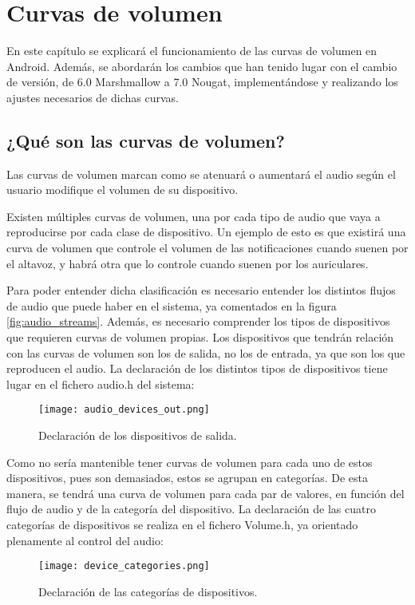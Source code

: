 \chapter{Curvas de volumen} \label{chap:curvas_volumen}
En este capítulo se explicará el funcionamiento de las curvas de volumen en Android. Además, se abordarán los cambios que han tenido lugar con el cambio de versión, de 6.0 Marshmallow a 7.0 Nougat, implementándose y realizando los ajustes necesarios de dichas curvas.

\section{¿Qué son las curvas de volumen?}
Las curvas de volumen marcan como se atenuará o aumentará el audio según el usuario modifique el volumen de su dispositivo.

Existen múltiples curvas de volumen, una por cada tipo de audio que vaya a reproducirse por cada clase de dispositivo. Un ejemplo de esto es que existirá una curva de volumen que controle el volumen de las notificaciones cuando suenen por el altavoz, y habrá otra que lo controle cuando suenen por los auriculares.

Para poder entender dicha clasificación es necesario entender los distintos flujos de audio que puede haber en el sistema, ya comentados en la figura \ref{fig:audio_streams}.
Además, es necesario comprender los tipos de dispositivos que requieren curvas de volumen propias. Los dispositivos que tendrán relación con las curvas de volumen son los de salida, no los de entrada, ya que son los que reproducen el audio. La declaración de los distintos tipos de dispositivos tiene lugar en el fichero audio.h del sistema:

\begin{figure}[H]
	\centering
	\texttt{[image: audio\_devices\_out.png]}
	\caption{Declaración de los dispositivos de salida.}
	\label{fig:audio_devices_out}
\end{figure}

Como no sería mantenible tener curvas de volumen para cada uno de estos dispositivos, pues son demasiados, estos se agrupan en categorías. De esta manera, se tendrá una curva de volumen para cada par de valores, en función del flujo de audio y de la categoría del dispositivo. La declaración de las cuatro categorías de dispositivos se realiza en el fichero Volume.h, ya orientado plenamente al control del audio:

\begin{figure}[H]
	\centering
	\texttt{[image: device\_categories.png]}
	\caption{Declaración de las categorías de dispositivos.}
	\label{fig:device_categories}
\end{figure}


